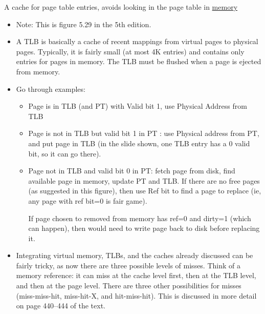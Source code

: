 \newpage
\begin{frame}[fragile]

A cache for page table entries, avoids looking in the page table in \underline{memory}
\BNotes\ifnum{}
\begin{itemize}
\item Note:  This is figure 5.29 in the 5th edition.

\item A TLB is basically a cache of recent mappings from virtual pages
to physical pages. Typically, it is fairly small (at most 4K
entries) and contains only entries for pages in memory. The TLB must
be flushed when a page is ejected from memory. 

\item Go through examples:
\begin{itemize}
	\item Page is in TLB (and PT) with Valid bit 1, use Physical Address from TLB
	\item Page is not in TLB but valid bit 1 in PT : use
		Physical address from PT, and put page in TLB (in the
		slide shown, one TLB entry has a 0 valid bit, so it can go 
		there).
	\item Page not in TLB and valid bit 0 in PT: fetch page from disk,
		find available page in memory, update PT and TLB.  If there
		are no free pages (as suggested in this figure), then use
		Ref bit to find a page to replace (ie, any page with ref
		bit=0 is fair game).

		If page chosen to removed from memory has ref=0 and dirty=1 
		(which can happen), then would need to write page back to disk 
		before replacing it.
\end{itemize}

\item Integrating virtual
memory, TLBs, and the caches already discussed can be fairly tricky,
as now there are three possible levels of misses. Think of a memory
reference: it can miss at the cache level first, then at the TLB
level, and then at the page level. There are three other possibilities
for misses (miss-miss-hit, miss-hit-X, and hit-miss-hit). This is
discussed in more detail on page 440--444 of the text.
\end{itemize}
\fi\ENotes
\end{frame}


